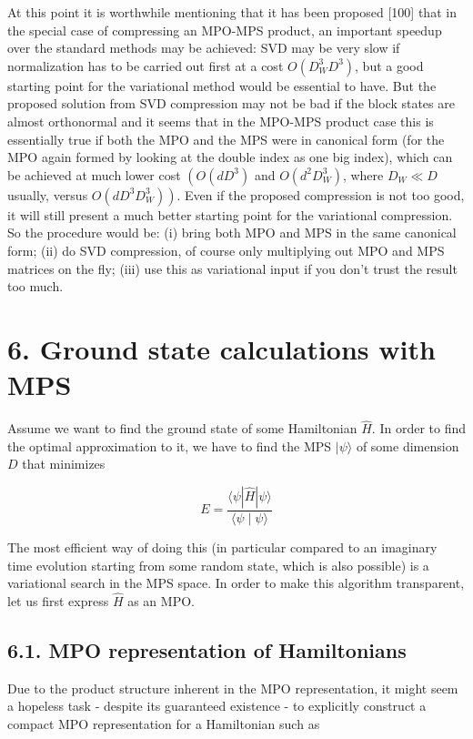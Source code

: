 \documentclass[12pt]{article}
\begin{document}
At this point it is worthwhile mentioning that it has been proposed [100] that in the special case of compressing an MPO-MPS product, an important speedup over the standard methods may be achieved: SVD may be very slow if normalization has to be carried out first at a cost $O\left(D_{W}^{3} D^{3}\right)$, but a good starting point for the variational method would be essential to have. But the proposed solution from SVD compression may not be bad if the block states are almost orthonormal and it seems that in the MPO-MPS product case this is essentially true if both the MPO and the MPS were in canonical form (for the MPO again formed by looking at the double index as one big index), which can be achieved at much lower cost $\left(O\left(d D^{3}\right)\right.$ and $O\left(d^{2} D_{W}^{3}\right)$, where $D_{W} \ll D$ usually, versus $\left.O\left(d D^{3} D_{W}^{3}\right)\right)$. Even if the proposed compression is not too good, it will still present a much better starting point for the variational compression. So the procedure would be: (i) bring both MPO and MPS in the same canonical form; (ii) do SVD compression, of course only multiplying out MPO and MPS matrices on the fly; (iii) use this as variational input if you don't trust the result too much.

\section*{6. Ground state calculations with MPS}
Assume we want to find the ground state of some Hamiltonian $\hat{H}$. In order to find the optimal approximation to it, we have to find the MPS $|\psi\rangle$ of some dimension $D$ that minimizes


\begin{equation*}
E=\frac{\langle\psi|\hat{H}| \psi\rangle}{\langle\psi \mid \psi\rangle} \tag{181}
\end{equation*}


The most efficient way of doing this (in particular compared to an imaginary time evolution starting from some random state, which is also possible) is a variational search in the MPS space. In order to make this algorithm transparent, let us first express $\hat{H}$ as an MPO.

\subsection*{6.1. MPO representation of Hamiltonians}
Due to the product structure inherent in the MPO representation, it might seem a hopeless task - despite its guaranteed existence - to explicitly construct a compact MPO representation for a Hamiltonian such as
\end{document}
